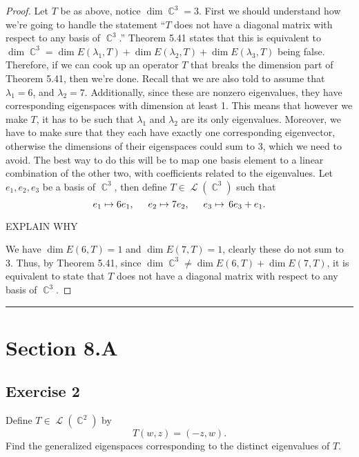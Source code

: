 \documentclass[letterpaper, 12pt]{amsart}
\DeclareMathOperator{\C}{\mathbb{C}}				%
\DeclareMathOperator{\Ell}{\mathscr{L}}				%
\theoremstyle{definition}  							%
\begin{document}
		\begin{proof}
		Let $T$ be as above, notice $\dim \C^{3} = 3$.
		First we should understand how we're going to handle the statement ``$T$ does not have a diagonal matrix with respect to any basis of $\C^{3}$.''
		Theorem 5.41 states that this is equivalent to $\dim \C^{3} = \dim E(\lambda_{1},T) + \dim E(\lambda_{2},T) + \dim E(\lambda_{3},T)$ being false.
		Therefore, if we can cook up an operator $T$ that breaks the dimension part of Theorem 5.41, then we're done.
		Recall that we are also told to assume that $\lambda_{1} = 6$, and $\lambda_{2} = 7$.
		Additionally, since these are nonzero eigenvalues, they have corresponding eigenspaces with dimension at least 1.
		This means that however we make $T$, it has to be such that $\lambda_{1}$ and $\lambda_{2}$ are its only eigenvalues.
		Moreover, we have to make sure that they each have exactly one corresponding eigenvector, otherwise the dimensions of their eigenspaces could sum to 3, which we need to avoid.
		The best way to do this will be to map one basis element to a linear combination of the other two, with coefficients related to the eigenvalues.
		Let $e_{1},e_{2},e_{3}$ be a basis of $\C^{3}$, then define $T \in \Ell(\C^{3})$ such that $$e_{1} \mapsto 6e_{1}, \hspace{5mm} e_{2} \mapsto 7e_{2}, \hspace{5mm} e_{3} \mapsto \, 6e_{3} + e_{1}.$$

		\vspace*{5mm}
		EXPLAIN WHY
		\vspace*{5mm}

		We have $\dim E(6,T) = 1$ and $\dim E(7,T) = 1$, clearly these do not sum to 3.
		Thus, by Theorem 5.41, since $\dim \C^3 \neq \dim E(6,T) + \dim E(7,T)$, it is equivalent to state that $T$ does not have a diagonal matrix with respect to any basis of $\C^{3}$.
		\end{proof}
		\vspace*{2mm}
		\hrule
		\vspace*{2mm}

	\section*{Section 8.A}
		\subsection*{Exercise 2}
		Define $T \in \Ell(\C^2)$ by $$T(w,z) = (-z,w).$$
		Find the generalized eigenspaces corresponding to the distinct eigenvalues of $T$.
\end{document}
